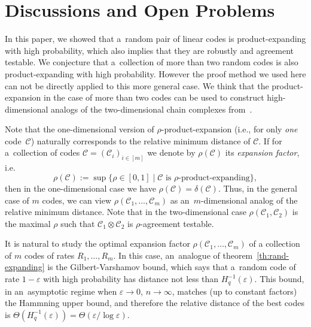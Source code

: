 \documentclass[11pt]{article}
\newcommand{\eps}{\varepsilon}
\theoremstyle{plain}
\theoremstyle{definition}
\theoremstyle{remark}
\newcommand{\cC}{\mathcal{C}}
\begin{document}
\section{Discussions and Open Problems}

In this paper, we showed that a~random pair of linear codes is product-expanding with high probability, which also implies that they are robustly and agreement testable. We conjecture that a~collection of more than two random codes is also product-expanding with high probability. However the proof method we used here can not be directly applied to this more general case. We think that the product-expansion in the case of more than two codes can be used to construct high-dimensional analogs of the two-dimensional chain complexes from~\cite{Dinur:stoc2022, Panteleev&Kalachev:stoc2022}.  

Note that the one-dimensional version of $\rho$-product-expansion (i.e., for only \emph{one} code~$\cC$) naturally corresponds to the relative minimum distance of $\cC$. If for a~collection of codes $\cC = (\cC_i)_{i\in[m]}$ we denote by $\rho(\cC)$ its \emph{expansion factor}, i.e. \[
\rho(\cC) := \sup \{\rho \in [0,1] \mid \cC \text{ is  $\rho$-product-expanding}\},
\]   
then in the one-dimensional case we have $\rho(\cC) = \delta(\cC)$. Thus, in the general case of $m$ codes, we can view $\rho(\cC_1,\dots,\cC_m)$ as an~$m$-dimensional analog of the relative minimum distance.  Note that in the two-dimensional case $\rho(\cC_1,\cC_2)$ is the maximal $\rho$ such that $\cC_1\otimes\cC_2$ is $\rho$-agreement testable. 

It is natural to study the optimal expansion factor $\rho(\cC_1,\dots,\cC_m)$ of a collection of $m$ codes of rates $R_1,\dots,R_m$.     
In this case, an~analogue of theorem~\ref{th:rand-expanding} is the Gilbert-Varshamov bound, which says that a~random code of rate $1-\eps$ with high probability has distance not less than $H^{-1}_q(\eps)$. This bound, in an~asymptotic regime when $\eps\to 0$, $n\to\infty$, matches (up to constant factors) the Hammning upper bound, and therefore the relative distance of the best codes is $\Theta(H^{-1}_q(\eps))=\Theta(\eps/\log \eps)$.
\end{document}
